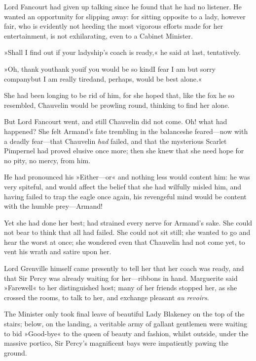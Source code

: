 Lord Fancourt had given up talking since he found that he had no listener. He wanted an opportunity for slipping away: for sitting opposite to a lady, however fair, who is evidently not heeding the most vigorous efforts made for her entertainment, is not exhilarating, even to a Cabinet Minister.

»Shall I find out if your ladyship's coach is ready,« he said at last, tentatively.

»Oh, thank you\textellipsis \allowbreak  thank you\textellipsis \allowbreak  if you would be so kind\textellipsis \allowbreak  I fear I am but sorry company\textellipsis \allowbreak  but I am really tired\textellipsis \allowbreak  and, perhaps, would be best alone.«

She had been longing to be rid of him, for she hoped that, like the fox he so resembled, Chauvelin would be prowling round, thinking to find her alone.

But Lord Fancourt went, and still Chauvelin did not come. Oh! what had happened? She felt Armand's fate trembling in the balance\textellipsis \allowbreak  she feared—now with a deadly fear—that Chauvelin \textit{had} failed, and that the mysterious Scarlet Pimpernel had proved elusive once more; then she knew that she need hope for no pity, no mercy, from him.

He had pronounced his »Either—or\longdash« and nothing less would content him: he was very spiteful, and would affect the belief that she had wilfully misled him, and having failed to trap the eagle once again, his revengeful mind would be content with the humble prey—Armand!

Yet she had done her best; had strained every nerve for Armand's sake. She could not bear to think that all had failed. She could not sit still; she wanted to go and hear the worst at once; she wondered even that Chauvelin had not come yet, to vent his wrath and satire upon her.

Lord Grenville himself came presently to tell her that her coach was ready, and that Sir Percy was already waiting for her—ribbons in hand. Marguerite said »Farewell« to her distinguished host; many of her friends stopped her, as she crossed the rooms, to talk to her, and exchange pleasant \textit{au revoirs}.

The Minister only took final leave of beautiful Lady Blakeney on the top of the stairs; below, on the landing, a veritable army of gallant gentlemen were waiting to bid »Good-bye« to the queen of beauty and fashion, whilst outside, under the massive portico, Sir Percy's magnificent bays were impatiently pawing the ground.

